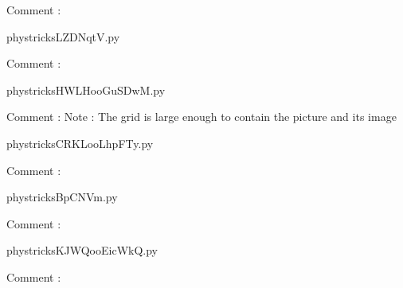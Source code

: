    Comment : 

    \clearpage
    


    \newcommand{\CaptionFigLZDNqtV}{<+Type your caption here+>}
    \begin{center}
        
    \end{center}
    phystricksLZDNqtV.py

    Comment : 

    \clearpage
    


    \newcommand{\CaptionFigHWLHooGuSDwM}{<+Type your caption here+>}
    \begin{center}
        
    \end{center}
    phystricksHWLHooGuSDwM.py

    Comment : Note : The grid is large enough to contain the picture and its image

    \clearpage
    


    \newcommand{\CaptionFigCRKLooLhpFTy}{<+Type your caption here+>}
    \begin{center}
        
    \end{center}
    phystricksCRKLooLhpFTy.py

    Comment : 

    \clearpage
    


    \newcommand{\CaptionFigBpCNVm}{<+Type your caption here+>}
    \begin{center}
        
    \end{center}
    phystricksBpCNVm.py

    Comment : 

    \clearpage
    


    \newcommand{\CaptionFigKJWQooEicWkQ}{<+Type your caption here+>}
    \begin{center}
        
    \end{center}
    phystricksKJWQooEicWkQ.py

    Comment : 

